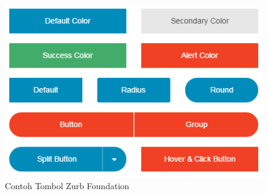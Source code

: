 \begin{itemize}
\begin{itemize}
\begin{enumerate}[(1)]
\begin{figure}[H]
\centering
\includegraphics[scale=0.7]{Gambar/button.png}
\caption[Contoh Tombol Zurb Foundation]{Contoh Tombol Zurb Foundation}
\label{fig:button}
\end{figure}


\end{enumerate}
\end{itemize}
\end{itemize}
